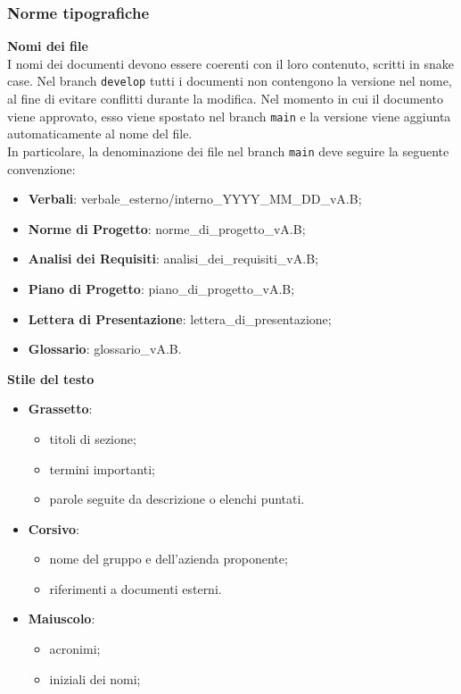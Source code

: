 \subsubsection{Norme tipografiche}
\textbf{Nomi dei file}\\ I nomi dei documenti devono essere coerenti con il loro contenuto,
scritti in snake case. Nel branch \texttt{develop} tutti i documenti non contengono la versione nel nome, al fine di evitare conflitti durante la modifica.
Nel momento in cui il documento viene approvato, esso viene spostato nel branch \texttt{main} e la versione viene aggiunta automaticamente al nome del file.\\
In particolare, la denominazione dei file nel branch \texttt{main} deve seguire la seguente convenzione:
\begin{itemize}
	\item \textbf{Verbali}: verbale\_esterno/interno\_YYYY\_MM\_DD\_vA.B;
	\item \textbf{Norme di Progetto}: norme\_di\_progetto\_vA.B;
	\item \textbf{Analisi dei Requisiti}: analisi\_dei\_requisiti\_vA.B;
	\item \textbf{Piano di Progetto}: piano\_di\_progetto\_vA.B;
	\item \textbf{Lettera di Presentazione}: lettera\_di\_presentazione;
	\item \textbf{Glossario}: glossario\_vA.B.
\end{itemize}
\textbf{Stile del testo}
\begin{itemize}
	\item \textbf{Grassetto}:
	      \begin{itemize}
		      \item titoli di sezione;
		      \item termini importanti;
		      \item parole seguite da descrizione o elenchi puntati.
	      \end{itemize}
	\item \textbf{Corsivo}:
	      \begin{itemize}
		      \item nome del gruppo e dell'azienda proponente;
		      \item riferimenti a documenti esterni.
	      \end{itemize}
	\item \textbf{Maiuscolo}:
	      \begin{itemize}
		      \item acronimi;
		      \item iniziali dei nomi;
	      \end{itemize}
\end{itemize}
